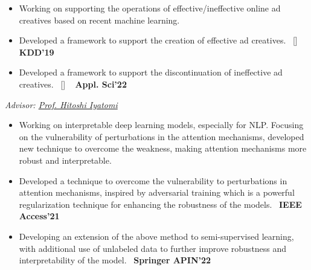\begin{projects}
{\begin{itemize}
			\setlength\itemsep{0.3em}
			\item Working on supporting the operations of effective/ineffective online ad creatives based on recent machine learning.
			\item Developed a framework to support the creation of effective ad creatives.~ [\href{https://github.com/shunk031/Multi-task-Conditional-Attention-Networks}{\small{\githubSymbol}}] ~ {\small{\lbrack\textbf{{KDD'19}}\rbrack}}
			\item Developed a framework to support the discontinuation of ineffective ad creatives.~ [\href{https://www.mdpi.com/2076-3417/12/7/3594}{\small{\websiteSymbol}}] ~ {\small{\lbrack\textbf{{Appl. Sci'22}}\rbrack}}
		\end{itemize}
	}
	{
		\textit{Advisor:  \href{https://iyatomi-lab.info/english/people/2013-6-8}{Prof. Hitoshi Iyatomi}}
	}
	{
		\begin{itemize}
			\setlength\itemsep{0.3em}
			\item Working on interpretable deep learning models, especially for NLP. Focusing on the vulnerability of perturbations in the attention mechanisms, developed new technique to overcome the weakness, making attention mechanisms more robust and interpretable.
			\item Developed a technique to overcome the vulnerability to perturbations in attention mechanisms, inspired by adversarial training which is a powerful regularization technique for enhancing the robustness of the models.~ {\small{\lbrack\textbf{{IEEE Access'21}}\rbrack}}
			\item Developing an extension of the above method to semi-supervised learning, with additional use of unlabeled data to further improve robustness and interpretability of the model.~ {\small{\lbrack\textbf{{Springer APIN'22}}\rbrack}}
		\end{itemize}
	}

\end{projects}
